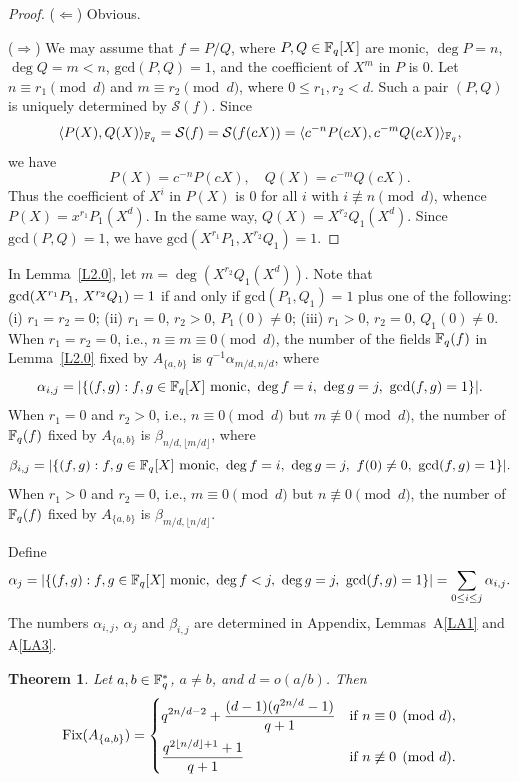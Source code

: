 \documentclass{amsart}
\newtheorem{thm}{Theorem}[section]
\numberwithin{equation}{section}
\theoremstyle{definition}
\newcommand{\f}{\Bbb F}
\begin{document}
\begin{proof}
($\Leftarrow$) Obvious.

\medskip
($\Rightarrow$) We may assume that $f=P/Q$, where $P,Q\in\f_q[X]$ are monic, $\deg P=n$, $\deg Q=m<n$, $\text{gcd}(P,Q)=1$, and the coefficient of $X^m$ in $P$ is 0. Let $n\equiv r_1\pmod d$ and $m\equiv r_2\pmod d$, where $0\le r_1,r_2<d$. Such a pair $(P,Q)$ is uniquely determined by $\mathcal S(f)$. Since
\[
\langle P(X),Q(X)\rangle_{\f_q}=\mathcal S(f)=\mathcal S(f(cX))=\langle c^{-n}P(cX),c^{-m}Q(cX)\rangle_{\f_q},
\]
we have
\[
P(X)=c^{-n}P(cX),\quad Q(X)=c^{-m}Q(cX).
\]
Thus the coefficient of $X^i$ in $P(X)$ is 0 for all $i$ with $i\not\equiv n\pmod d$, whence $P(X)=x^{r_1}P_1(X^d)$. In the same way, $Q(X)=X^{r_2}Q_1(X^d)$. Since $\text{gcd}(P,Q)=1$, we have $\text{gcd}(X^{r_1}P_1,X^{r_2}Q_1)=1$.
\end{proof}

In Lemma~\ref{L2.0}, let $m=\deg(X^{r_2}Q_1(X^d))$. Note that $\text{\rm gcd}(X^{r_1}P_1,\,X^{r_2}Q_1)=1$ if and only if $\text{gcd}(P_1,Q_1)=1$ plus one of the following: (i) $r_1=r_2=0$; (ii) $r_1=0$, $r_2>0$, $P_1(0)\ne 0$; (iii) $r_1>0$, $r_2=0$, $Q_1(0)\ne 0$. When $r_1=r_2=0$, i.e., $n\equiv m\equiv 0\pmod d$, the number of the fields $\f_q(f)$ in Lemma~\ref{L2.0} fixed by $A_{\{a,b\}}$ is $q^{-1}\alpha_{m/d,n/d}$, where
\[
\alpha_{i,j}=|\{(f,g):f,g\in\f_q[X]\ \text{monic},\ \deg f=i,\ \deg g=j,\ \text{gcd}(f,g)=1\}|.
\]
When $r_1=0$ and $r_2>0$, i.e., $n\equiv 0\pmod d$ but $m\not\equiv 0\pmod d$, the number of $\f_q(f)$ fixed by $A_{\{a,b\}}$ is $\beta_{n/d,\lfloor m/d\rfloor}$, where
\[
\beta_{i,j}=|\{(f,g):f,g\in\f_q[X]\ \text{monic},\ \deg f=i,\ \deg g=j,\ f(0)\ne0,\ \text{gcd}(f,g)=1\}|.
\]
When $r_1>0$ and $r_2=0$, i.e., $m\equiv 0\pmod d$ but $n\not\equiv 0\pmod d$, the number of $\f_q(f)$ fixed by $A_{\{a,b\}}$ is $\beta_{m/d,\lfloor n/d\rfloor}$.

Define
\[
\alpha_j=|\{(f,g):f,g\in\f_q[X]\ \text{monic},\ \deg f<j,\ \deg g=j,\ \text{gcd}(f,g)=1\}|=\sum_{0\le i\le j}\alpha_{i,j}.
\]
The numbers $\alpha_{i,j}$, $\alpha_j$ and $\beta_{i,j}$ are determined in Appendix, Lemmas~A\ref{LA1} and A\ref{LA3}.

\begin{thm}\label{T2.1}
Let $a,b\in\f_q^*$, $a\ne b$, and $d=o(a/b)$. Then
\[
\text{\rm Fix}(A_{\{a,b\}})=\begin{cases}
\displaystyle q^{2n/d-2}+\frac{(d-1)(q^{2n/d}-1)}{q+1}&\text{if}\ n\equiv 0\pmod d,\vspace{0.5em}\cr
\displaystyle \frac{q^{2\lfloor n/d\rfloor+1}+1}{q+1}&\text{if}\ n\not\equiv 0\pmod d.
\end{cases}
\]
\end{thm}
\end{document}
